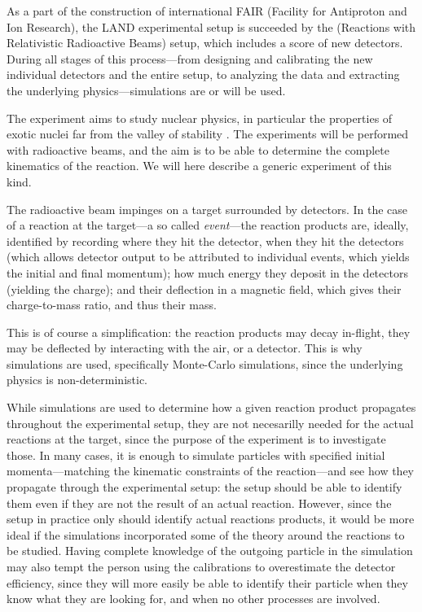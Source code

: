 As a part of the construction of international FAIR (Facility for Antiproton and Ion Research), the LAND experimental setup is succeeded by the \rtb{} (Reactions with Relativistic Radioactive Beams) setup, which includes a score of new detectors. During all stages of this process---from designing and calibrating the new individual detectors and the entire setup, to analyzing the data and extracting the underlying physics---simulations are or will be used. 

The \rtb{} experiment aims to study nuclear physics, in particular the properties of exotic nuclei far from the valley of stability \cite{r3b:online}. The experiments will be performed with radioactive beams, and the aim is to be able to determine the complete kinematics of the reaction. We will here describe a generic experiment of this kind.

The radioactive beam impinges on a target surrounded by detectors. In the case of a reaction at the target---a so called \emph{event}---the reaction products are, ideally, identified by recording where they hit the detector, when they hit the detectors (which allows detector output to be attributed to individual events, which yields the initial and final momentum); how much energy they deposit in the detectors (yielding the charge); and their deflection in a magnetic field, which gives their charge-to-mass ratio, and thus their mass. 

This is of course a simplification: the reaction products may decay in-flight, they may be deflected by interacting with the air, or a detector. This is why simulations are used, specifically Monte-Carlo simulations, since the underlying physics is non-deterministic. 

While simulations are used to determine how a given reaction product propagates throughout the experimental setup, they are not necesarilly needed for the actual reactions at the target, since the purpose of the experiment is to investigate those. 
In many cases, it is enough to simulate particles with specified initial momenta---matching the kinematic constraints of the reaction---and see how they propagate through the experimental setup: the setup should be able to identify them even if they are not the result of an actual reaction.
However, since the setup in practice only should identify actual reactions products, it would be more ideal if the simulations incorporated some of the theory around the reactions to be studied. 
Having complete knowledge of the outgoing particle in the simulation may also tempt the person using the calibrations to overestimate the detector efficiency, since they will more easily be able to identify their particle when they know what they are looking for, and when no other processes are involved.

